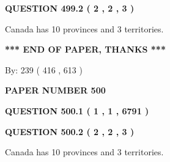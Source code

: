 \documentclass[12pt]{article}
\begin{document}
\vspace{0.2in}
  
{\textbf{\Large{QUESTION
499.2 
 ( 2 , 2 , 3 )
}}}
  
  
 
 
\noindent{}
 
 
Canada has 10  provinces and 3 territories.
 
 
 
 
   
   
 \vspace{0.2in}
 
   
   
   
   
\vspace{1.0in} 
{\textbf{\large{ *** END OF PAPER, THANKS *** }}} 
   
   
\hspace{1.0in} By: 
 239 ( 416 ,  613 )
   
   
   
   
\newpage 
\setcounter{page}{ 
   500001 } 
   
   
   
   
 {\textbf{ \Large{ PAPER NUMBER  500  }}}
   
   
\vspace{0.2in}
   
   
   
   
   
   
 \vspace{0.2in}
 
 
 
 
   
   
  
\vspace{0.2in}
  
{\textbf{\Large{QUESTION
500.1 
 ( 1 , 1 , 6791 )
}}}
  
  
  
\vspace{0.2in}
  
{\textbf{\Large{QUESTION
500.2 
 ( 2 , 2 , 3 )
}}}
  
  
 
 
\noindent{}
 
 
Canada has 10  provinces and 3 territories.
 
\end{document}
